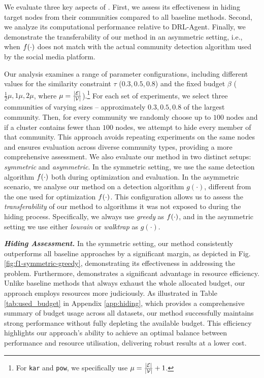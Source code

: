 We evaluate three key aspects of  \method{}. First, we assess its effectiveness in hiding target nodes from their communities compared to all baseline methods. Second, we analyze its computational performance relative to DRL-Agent. Finally, we demonstrate the transferability of our method in an asymmetric setting, i.e., when $f(\cdot)$ does not match with the actual community detection algorithm used by the social media platform.

Our analysis examines a range of parameter configurations, including different values for the similarity constraint $ \tau $ ($0.3, 0.5, 0.8$) and the fixed budget $ \beta $ ($ \frac{1}{2} \mu, 1\mu, 2\mu$, where $ \mu = \frac{|\mathcal{E}|}{|\mathcal{V}|}$).\footnote{For \texttt{kar} and \texttt{pow}, we specifically use $ \mu = \frac{|\mathcal{E}|}{|\mathcal{V}|} + 1$.} 
For each set of experiments, we select three communities of varying sizes -- approximately $0.3, 0.5, 0.8 $ of the largest community. Then, for every community we randomly choose up to $100$ nodes and
if a cluster contains fewer than $100$ nodes, we attempt to hide every member of that community. This approach avoids repeating experiments on the same nodes and ensures evaluation across diverse community types, providing a more comprehensive assessment. We also evaluate our method in two distinct setups: \emph{symmetric} and \emph{asymmetric}. In the symmetric setting, we use the same detection algorithm $f(\cdot)$ both during optimization and evaluation. In the asymmetric scenario, we analyse our method on a detection algorithm $g(\cdot)$, different from the one used for optimization $f(\cdot)$. This configuration allows us to assess the \emph{transferability} of our method to algorithms it was not exposed to during the hiding process. Specifically, we always use \textit{greedy} as $f(\cdot)$, and in the asymmetric setting we use either \textit{louvain} or \textit{walktrap} as $g(\cdot)$.



\textbf{\textit{Hiding Assessment.}}
In the symmetric setting, our method consistently outperforms all baseline approaches by a significant margin, as depicted in Fig.\ref{fig:f1-symmetric-greedy}, demonstrating its effectiveness in addressing the problem.
Furthermore, \method{} demonstrates a significant advantage in resource efficiency. Unlike baseline methods that always exhaust the whole allocated budget, our approach employs resources more judiciously. As illustrated in Table \ref{tab:used_budget} in Appendix \ref{app:hiding}, which provides a comprehensive summary of budget usage across all datasets, our method successfully maintains strong performance without fully depleting the available budget. %
This efficiency highlights our approach's ability to achieve an optimal balance between performance and resource utilisation, delivering robust results at a lower cost. \\


